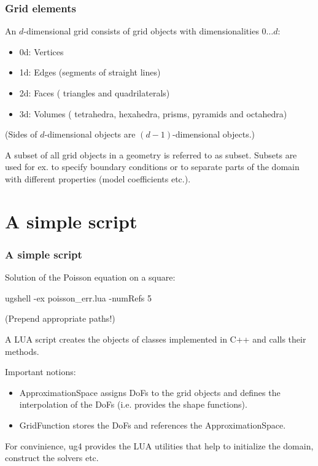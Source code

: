 \documentclass[xcolor=dvipsnames]{beamer}
\begin{document}
\begin {frame} [t]
\frametitle {Grid elements}
An $d$-dimensional grid consists of {\color{blue} grid objects} with dimensionalities
$0 \dots d$:
\begin {itemize}
	\item 0d: {\color{blue} Vertices}
	\item 1d: {\color{blue} Edges} (segments of straight lines)
	\item 2d: {\color{blue} Faces} ({\color{blue} triangles} and {\color{blue} quadrilaterals})
	\item 3d: {\color{blue} Volumes} ({\color{blue} tetrahedra}, {\color{blue} hexahedra},
		{\color{blue} prisms}, {\color{blue} pyramids} and {\color{blue} octahedra})
\end {itemize}
(Sides of $d$-dimensional objects are $(d-1)$-dimensional objects.)

\pause
\vspace {1ex}
A subset of all grid objects in a geometry is referred to as {\color{blue} subset}. Subsets
are used for ex. to specify boundary conditions or to separate parts of the domain with
different properties (model coefficients etc.).
\end {frame}

\section {A simple script}

\begin {frame} [t]
\frametitle {A simple script}
\vspace{-2ex}
Solution of the Poisson equation on a square:

\vspace {1ex}
{\color{blue} ugshell -ex poisson\_err.lua -numRefs 5}

{\tiny \color{red} (Prepend appropriate paths!)}

\pause
\vspace {1ex}
A LUA script creates the objects of classes implemented in C++ and calls their methods.

\pause
\vspace {1ex}
Important notions:
\begin {itemize}
	\item {\color{blue} ApproximationSpace} assigns DoFs to the grid objects and
		defines the interpolation of the DoFs (i.e. provides the shape functions).
	\item {\color{blue} GridFunction} stores the DoFs and references the ApproximationSpace.
\end {itemize}

\pause
\vspace {1ex}
For convinience, ug4 provides the LUA utilities that help to initialize the domain,
construct the solvers etc.
\end {frame}
\end{document}
